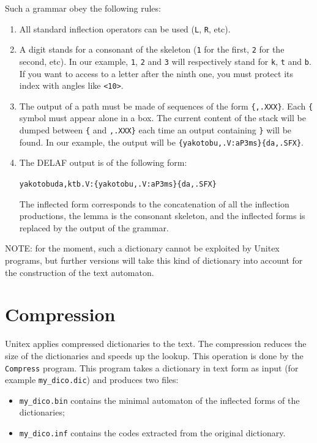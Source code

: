 \bigskip
\noindent Such a grammar obey the following rules:
\begin{enumerate}
  \item All standard inflection operators can be used (\verb+L+, \verb+R+, etc).
  \item A digit stands for a consonant of the skeleton (\verb+1+ for the first,
  \verb+2+ for the second, etc). In our example, \verb+1+, \verb+2+ and
  \verb+3+ will respectively stand for \verb+k+, \verb+t+ and
  \verb+b+. If you want to access to a letter after the ninth one, you must
  protect its index with angles like \verb+<10>+.
  \item The output of a path must be made of sequences of the form
  \verb+{,.XXX}+. Each \verb+{+ symbol must appear alone in a box. The current
  content of the stack will be dumped between \verb+{+ and \verb+,.XXX}+ each
  time an output containing \verb+}+ will be found. In our example, the output
  will be \verb+{yakotobu,.V:aP3ms}{da,.SFX}+.
  \item The DELAF output is of the following form: 
  
  \verb+yakotobuda,ktb.V:{yakotobu,.V:aP3ms}{da,.SFX}+
  
  The inflected form corresponds to the concatenation of all the inflection
  productions, the lemma is the consonant skeleton, and the inflected forms is
  replaced by the output of the grammar.
\end{enumerate}  

\noindent NOTE: for the moment, such a dictionary
cannot be exploited by Unitex programs, but further versions will take this
kind of dictionary into account for the construction of the text automaton.

\section{Compression}

Unitex applies compressed dictionaries to the text. The compression reduces the
size of the dictionaries and speeds up the lookup. This operation is done by the
\verb+Compress+ program. This program takes a dictionary in text form 
as input (for example \verb+my_dico.dic+) and produces two files:

\begin{itemize}
  \item \verb+my_dico.bin+ contains the minimal automaton of the inflected forms of the dictionaries;
  \item \verb+my_dico.inf+ contains the codes extracted from the original dictionary.
\end{itemize}

